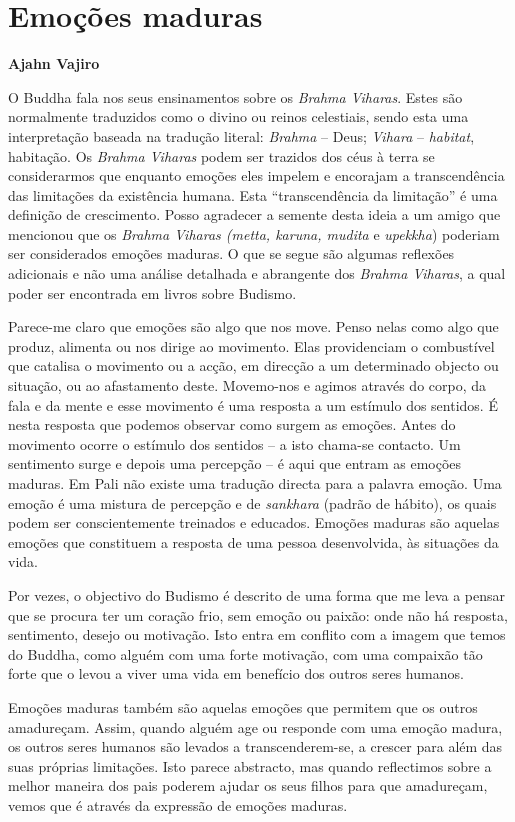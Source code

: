 \chapter{Emoções maduras}

\textbf{Ajahn Vajiro}

O Buddha fala nos seus ensinamentos sobre os \emph{Brahma Viharas}.
Estes são normalmente traduzidos como o divino ou reinos celestiais,
sendo esta uma interpretação baseada na tradução literal: \emph{Brahma}
-- Deus; \emph{Vihara} -- \emph{habitat}, habitação. Os \emph{Brahma
Viharas} podem ser trazidos dos céus à terra se considerarmos que
enquanto emoções eles impelem e encorajam a transcendência das
limitações da existência humana. Esta ``transcendência da limitação'' é
uma definição de crescimento. Posso agradecer a semente desta ideia a um
amigo que mencionou que os \emph{Brahma Viharas (metta, karuna, mudita}
e \emph{upekkha}) poderiam ser considerados emoções maduras. O que se
segue são algumas reflexões adicionais e não uma análise detalhada e
abrangente dos \emph{Brahma Viharas}, a qual poder ser encontrada em
livros sobre Budismo.

Parece-me claro que emoções são algo que nos move. Penso nelas como algo
que produz, alimenta ou nos dirige ao movimento. Elas providenciam o
combustível que catalisa o movimento ou a acção, em direcção a um
determinado objecto ou situação, ou ao afastamento deste. Movemo-nos e
agimos através do corpo, da fala e da mente e esse movimento é uma
resposta a um estímulo dos sentidos. É nesta resposta que podemos
observar como surgem as emoções. Antes do movimento ocorre o estímulo
dos sentidos -- a isto chama-se contacto. Um sentimento surge e depois
uma percepção -- é aqui que entram as emoções maduras. Em Pali não
existe uma tradução directa para a palavra emoção. Uma emoção é uma
mistura de percepção e de \emph{sankhara} (padrão de hábito), os quais
podem ser conscientemente treinados e educados. Emoções maduras são
aquelas emoções que constituem a resposta de uma pessoa desenvolvida, às
situações da vida.

Por vezes, o objectivo do Budismo é descrito de uma forma que me leva a
pensar que se procura ter um coração frio, sem emoção ou paixão: onde
não há resposta, sentimento, desejo ou motivação. Isto entra em conflito
com a imagem que temos do Buddha, como alguém com uma forte motivação,
com uma compaixão tão forte que o levou a viver uma vida em benefício
dos outros seres humanos.

Emoções maduras também são aquelas emoções que permitem que os outros
amadureçam. Assim, quando alguém age ou responde com uma emoção madura,
os outros seres humanos são levados a transcenderem-se, a crescer para
além das suas próprias limitações. Isto parece abstracto, mas quando
reflectimos sobre a melhor maneira dos pais poderem ajudar os seus
filhos para que amadureçam, vemos que é através da expressão de emoções
maduras.

